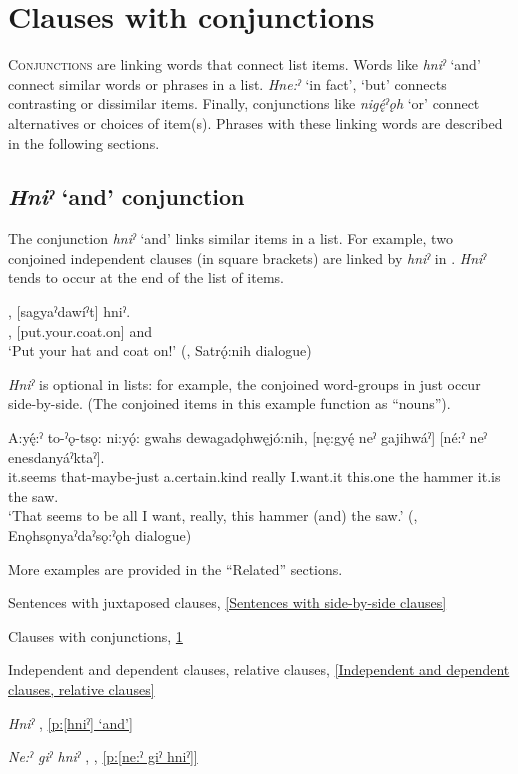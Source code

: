 \chapter{Clauses with conjunctions} \label{ch:Clauses with conjunctions}
\textsc{Conjunctions} are linking words that connect list items. Words like \textit{hniˀ} ‘and’ connect similar words or phrases in a list. \textit{Hne:ˀ} ‘in fact’, ‘but’ connects contrasting or dissimilar items. Finally, conjunctions like \textit{nigę́ˀǫh} ‘or’ connect alternatives or choices of item(s). Phrases with these linking words are described in the following sections.

\section{\textit{Hniˀ} ‘and’ conjunction} \label{ch:[hniˀ] ‘and’ conjunction}
The conjunction \textit{hniˀ} ‘and’ links similar items in a list. For example, two conjoined independent clauses (in square brackets) are linked by \textit{hniˀ} in . \textit{Hniˀ} tends to occur at the end of the list of items. 

\ea\label{ex:conjex3}
\gll [Sanaháowe:k], [sagyaˀdawíˀt] hniˀ.\\
[put.your.hat.on], [put.your.coat.on] and\\
\glt ‘Put your hat and coat on!’ (\cite[212]{mithun_watewayestanih_1984}, Satrǫ́:nih dialogue)
\z

\textit{Hniˀ} is optional in lists: for example, the conjoined word-groups in  just occur side-by-side. (The conjoined items in this example function as “nouns”).

\ea\label{ex:conjex4} 
\gll A:yę́:ˀ to-ˀǫ-tsǫ: ni:yǫ́: gwahs dewagadǫhwęjó:nih, [nę:gyę́ neˀ gajihwáˀ] [né:ˀ neˀ enesdanyáˀktaˀ].\\
it.seems that-maybe-just a.certain.kind really I.want.it this.one the hammer it.is the saw. \\
\glt ‘That seems to be all I want, really, this hammer (and) the saw.’ (\cite[159]{mithun_watewayestanih_1984}, Enǫhsǫnyaˀdaˀsǫ:ˀǫh dialogue)
\z

More examples are provided in the “Related” sections.

\begin{CayugaRelated}
\item Sentences with juxtaposed clauses, \ref{Sentences with side-by-side clauses}

\item Clauses with conjunctions, \ref{ch:Clauses with conjunctions}

\item Independent and dependent clauses, relative clauses, \ref{Independent and dependent clauses, relative clauses}

\item{} \textit{Hniˀ} , \ref{p:[hniˀ] ‘and’}

\item{} \textit{Ne:ˀ giˀ hniˀ} , , \ref{p:[ne:ˀ giˀ hniˀ]}

\end{CayugaRelated}


